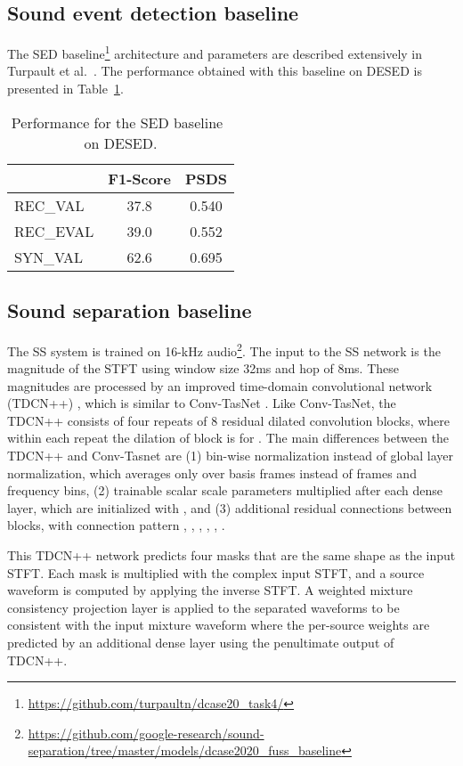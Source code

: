 \documentclass{article}
\begin{document}
\begin{sloppy}
\subsection{Sound event detection baseline}
The SED baseline\footnote{\url{https://github.com/turpaultn/dcase20_task4/}} architecture and parameters are described extensively in Turpault et al.~\cite{turpault2020}. The performance obtained with this baseline on DESED is presented in Table~\ref{tab:sed_base}.

\begin{table}[]
    \centering
    \caption{Performance for the SED baseline~\cite{turpault2020} on DESED.}
\begin{tabular}{|l|c|c|}
\hline & F1-Score & PSDS \\
  \hline
REC\_VAL & 37.8&	0.540\\
REC\_EVAL&39.0 &0.552\\\hline
SYN\_VAL &62.6&0.695\\
\hline
\end{tabular}
\label{tab:sed_base}
\end{table}










\subsection{Sound separation baseline}
The SS system is trained on 16-kHz audio\footnote{ \url{https://github.com/google-research/sound-separation/tree/master/models/dcase2020_fuss_baseline}}. The input to the SS network is the magnitude of the STFT using window size 32ms and hop of 8ms. These magnitudes are processed by an improved time-domain convolutional network (TDCN++) \cite{kavalerov2019universal, tzinis2020improving}, which is similar to Conv-TasNet \cite{luo2019conv}. Like Conv-TasNet, the TDCN++ consists of four repeats of 8 residual dilated convolution blocks, where within each repeat the dilation of block  is  for . The main differences between the TDCN++ and Conv-Tasnet are (1) bin-wise normalization instead of global layer normalization, which averages only over basis frames instead of frames and frequency bins, (2) trainable scalar scale parameters multiplied after each dense layer, which are initialized with , and (3) additional residual connections between blocks, with connection pattern , , , , , .

This TDCN++ network predicts four masks that are the same shape as the input STFT. Each mask is multiplied with the complex input STFT, and a source waveform is computed by applying the inverse STFT. A weighted mixture consistency projection layer \cite{wisdom2019differentiable} is applied to the separated waveforms
to be consistent with the input mixture waveform
where the per-source weights
are predicted by an additional dense layer using the penultimate output of TDCN++. 


\end{sloppy}
\end{document}
